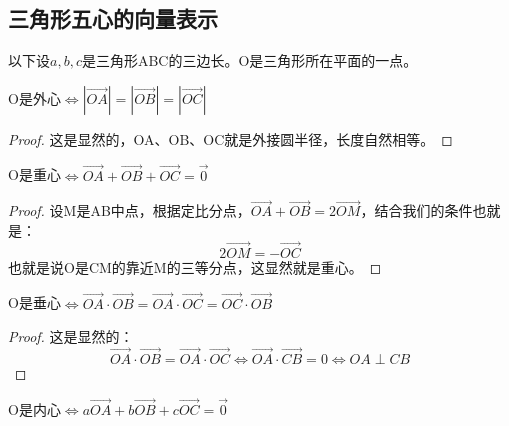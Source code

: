 \subsection{三角形五心的向量表示}
以下设$a,b,c$是三角形ABC的三边长。O是三角形所在平面的一点。

\begin{theorem}
    O是外心$\iff |\Vec{OA}| = |\Vec{OB}| = |\Vec{OC}|$
\end{theorem}
\begin{proof}
    这是显然的，OA、OB、OC就是外接圆半径，长度自然相等。
\end{proof}

\begin{theorem}
    O是重心$\iff \Vec{OA} + \Vec{OB} + \Vec{OC} = \Vec{0}$
\end{theorem}
\begin{proof}
    设M是AB中点，根据定比分点，$\Vec{OA} + \Vec{OB} = 2 \Vec{OM}$，结合我们的条件也就是：
    $$
        2 \Vec{OM} = -\Vec{OC}
    $$
    也就是说O是CM的靠近M的三等分点，这显然就是重心。
\end{proof}
\begin{theorem}
    O是垂心$\iff \Vec{OA} \cdot \Vec{OB} = \Vec{OA} \cdot \Vec{OC} = \Vec{OC} \cdot \Vec{OB}$
\end{theorem}
\begin{proof}
    这是显然的：
    $$
        \Vec{OA} \cdot \Vec{OB} = \Vec{OA} \cdot \Vec{OC} \iff \Vec{OA} \cdot \Vec{CB} = 0 \iff OA \perp CB
    $$
\end{proof}
\begin{theorem}
    O是内心$\iff a\Vec{OA} + b\Vec{OB} + c\Vec{OC} = \Vec{0}$
\end{theorem}
